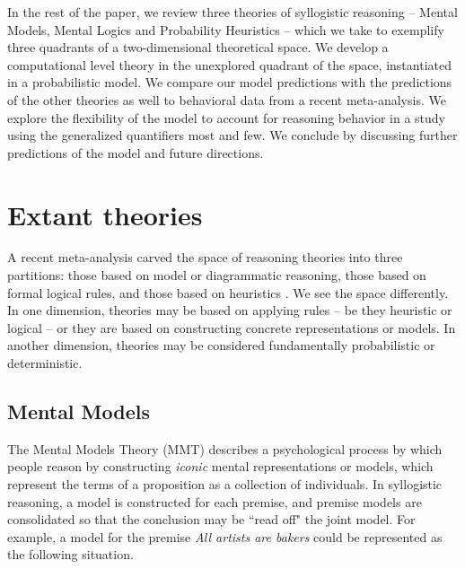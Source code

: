 \documentclass[10pt,letterpaper]{article}
\begin{document}
%
%

In the rest of the paper, we review three theories of syllogistic reasoning -- Mental Models, Mental Logics and Probability Heuristics -- which we take to exemplify three quadrants of a two-dimensional theoretical space. We develop a computational level theory in the unexplored quadrant of the space, instantiated in a probabilistic model. We compare our model predictions with the predictions of the other theories as well to behavioral data from a recent meta-analysis. We explore the flexibility of the model to account for reasoning behavior in a study using the generalized quantifiers most and few. We conclude by discussing further predictions of the model and future directions.  

\section{Extant theories}

A recent meta-analysis carved the space of reasoning theories into three partitions: those based on model or diagrammatic reasoning, those based on formal logical rules, and those based on heuristics \cite{Khemlani2012}. We see the space differently. In one dimension, theories may be based on applying rules -- be they heuristic or logical -- or they are based on constructing concrete representations or models. In another dimension, theories may be considered fundamentally probabilistic or deterministic. 

\subsection{Mental Models}
 The Mental Models Theory (MMT) describes a psychological process by which people reason by constructing {\em iconic} mental representations or models, which represent the terms of a proposition as a collection of individuals. In syllogistic reasoning, a model is constructed for each premise, and premise models are consolidated so that the conclusion may be ``read off" the joint model. For example, a model for the premise  \emph{All artists are bakers} could be represented as the following situation.
\end{document}
